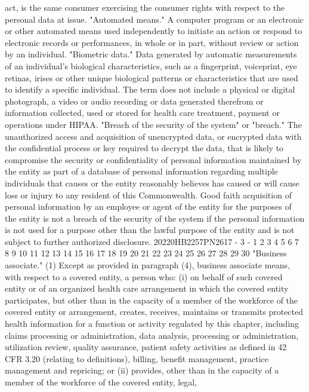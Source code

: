 act, is the same consumer exercising the consumer rights with
respect to the personal data at issue.
"Automated means." A computer program or an electronic or
other automated means used independently to initiate an action
or respond to electronic records or performances, in whole or in
part, without review or action by an individual.
"Biometric data." Data generated by automatic measurements
of an individual's biological characteristics, such as a
fingerprint, voiceprint, eye retinas, irises or other unique
biological patterns or characteristics that are used to identify
a specific individual. The term does not include a physical or
digital photograph, a video or audio recording or data generated
therefrom or information collected, used or stored for health
care treatment, payment or operations under HIPAA.
"Breach of the security of the system" or "breach." The
unauthorized access and acquisition of unencrypted data, or
encrypted data with the confidential process or key required to
decrypt the data, that is likely to compromise the security or
confidentiality of personal information maintained by the entity
as part of a database of personal information regarding multiple
individuals that causes or the entity reasonably believes has
caused or will cause loss or injury to any resident of this
Commonwealth. Good faith acquisition of personal information by
an employee or agent of the entity for the purposes of the
entity is not a breach of the security of the system if the
personal information is not used for a purpose other than the
lawful purpose of the entity and is not subject to further
authorized disclosure.
20220HB2257PN2617 - 3 -
1
2
3
4
5
6
7
8
9
10
11
12
13
14
15
16
17
18
19
20
21
22
23
24
25
26
27
28
29
30
"Business associate."
(1) Except as provided in paragraph (4), business
associate means, with respect to a covered entity, a person
who:
(i) on behalf of such covered entity or of an
organized health care arrangement in which the covered
entity participates, but other than in the capacity of a
member of the workforce of the covered entity or
arrangement, creates, receives, maintains or transmits
protected health information for a function or activity
regulated by this chapter, including claims processing or
administration, data analysis, processing or
administration, utilization review, quality assurance,
patient safety activities as defined in 42 CFR 3.20
(relating to definitions), billing, benefit management,
practice management and repricing; or
(ii) provides, other than in the capacity of a
member of the workforce of the covered entity, legal,
